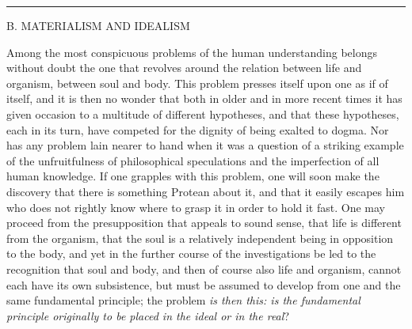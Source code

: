 \documentclass[12pt,a4paper,openany]{book}
\newcommand{\opage}[1]{\marginnote{\footnotesize\textit{[#1]}}}
\newcommand{\excerpthead}[1]{\par\bigskip\begin{center}#1\end{center}\nopagebreak\smallskip}
\newcommand{\sectionrule}{\par\begin{center}\rule{4em}{0.4pt}\end{center}}
\begin{document}
\sectionrule

\excerpthead{B. MATERIALISM AND IDEALISM}


Among the most conspicuous problems of the human understanding belongs without doubt
the one that revolves around the relation between life and organism, between soul and
body. This problem presses itself upon one as if of itself, and it is then no wonder
that both in older and in more recent times it has given occasion to a multitude of
different hypotheses, and that these hypotheses, each in its turn, have competed for
the dignity of being exalted to dogma. Nor has any problem lain nearer to hand when it
was a question of a striking example of the unfruitfulness of philosophical
speculations and the imperfection of all human knowledge. If one grapples with this
problem, one will soon make the discovery that there is something Protean about it,
and that it easily escapes him who does not rightly know where to grasp it in order to
hold it fast. One may proceed from the presupposition that appeals to sound sense,
that life is different from the organism, that the soul is a relatively independent
\setcounter{footnote}{0}%
\opage{202}being in opposition to the body, and yet in the further course of the
investigations be led to the recognition that soul and body, and then of course also
life and organism, cannot each have its own subsistence, but must be assumed to develop
from one and the same fundamental principle; the problem \emph{is then this: is the
fundamental principle originally to be placed in the ideal or in the real}?
\end{document}
